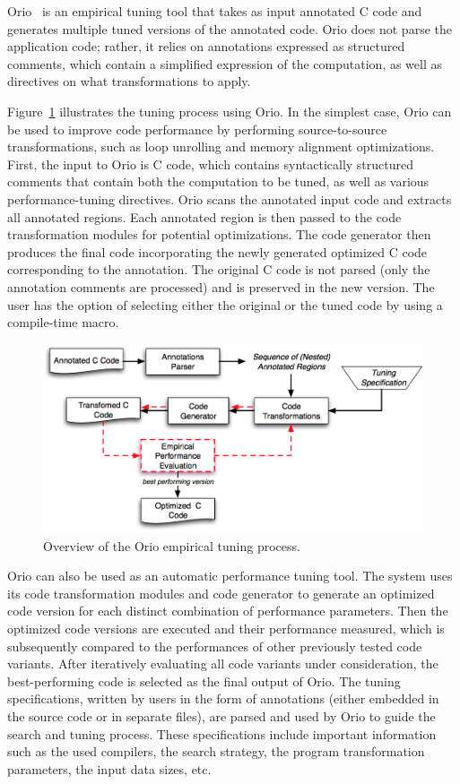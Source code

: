 \documentclass[11pt]{article}
\begin{document}
Orio~\cite{Norris:2007} is an empirical tuning tool that takes as input annotated C code and generates multiple tuned versions of the annotated code. Orio does not parse the application code; rather, it relies on annotations expressed as structured comments, which contain a simplified expression of the computation, as well as directives on what transformations to apply.


Figure~\ref{fig:orio} illustrates the tuning process using Orio. In the simplest case, Orio can be used to improve code performance by performing source-to-source transformations, such as loop unrolling and memory alignment optimizations. First, the input to Orio is C code, which contains syntactically structured comments that contain both the computation to be tuned, as well as various performance-tuning directives. Orio scans the annotated input code and extracts all annotated regions. Each annotated region is then passed to the code transformation modules for potential optimizations. The code generator then produces the final code incorporating the newly generated optimized C code corresponding to the annotation. The original C code is not parsed (only the annotation comments are processed) and is preserved in the new version. The user has the option of selecting either the original or the tuned code by using a compile-time macro.



\begin{figure}[htbp]
\centering
\includegraphics[width=.7\textwidth]{figures/orio.png}
\caption{Overview of the Orio empirical tuning process.}
\label{fig:orio}
\end{figure}


Orio can also be used as an automatic performance tuning tool. The system uses its code transformation modules and code generator to generate an optimized code version for each distinct combination of performance parameters. Then the optimized code versions are executed and their performance measured, which is subsequently compared to the performances of other previously tested code variants. After iteratively evaluating all code variants under consideration, the best-performing code is selected as the final output of Orio. The tuning specifications, written by users in the form of annotations (either embedded in the source code or in separate files), are parsed and used by Orio to guide the search and tuning process. These specifications include important information such as the used compilers, the search strategy, the program transformation parameters, the input data sizes, etc.
\end{document}
